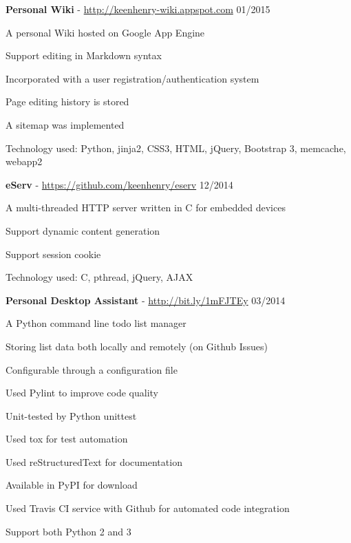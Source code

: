 \documentclass[margin,line]{resume}
\begin{document}
\begin{resume}
    \textbf{Personal Wiki} - \url{http://keenhenry-wiki.appspot.com} \hfill 01/2015 \vspace{-3mm}\\\vspace{-1mm}%
      \begin{list2}
       \item A personal Wiki hosted on Google App Engine
       \item Support editing in Markdown syntax
       \item Incorporated with a user registration/authentication system
       \item Page editing history is stored
       \item A sitemap was implemented
       \item Technology used: Python, jinja2, CSS3, HTML, jQuery, Bootstrap 3, memcache, webapp2%
      \end{list2}

    \textbf{eServ} - \url{https://github.com/keenhenry/eserv} \hfill 12/2014 \vspace{-3mm}\\\vspace{-1mm}%
      \begin{list2}
       \item A multi-threaded HTTP server written in C for embedded devices
       \item Support dynamic content generation
       \item Support session cookie
       \item Technology used: C, pthread, jQuery, AJAX%
      \end{list2}

    \textbf{Personal Desktop Assistant} - \url{http://bit.ly/1mFJTEy} \hfill 03/2014 \vspace{-3mm}\\\vspace{-1mm}%
      \begin{list2}
       \item A Python command line todo list manager
       \item Storing list data both locally and remotely (on Github Issues)
       \item Configurable through a configuration file
       \item Used Pylint to improve code quality
       \item Unit-tested by Python unittest
       \item Used tox for test automation
       \item Used reStructuredText for documentation
       \item Available in PyPI for download
       \item Used Travis CI service with Github for automated code integration
       \item Support both Python 2 and 3
      \end{list2}


\end{resume}
\end{document}
